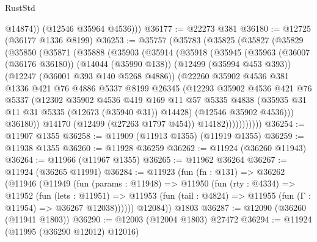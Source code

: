 \begin{lexlean}{RustStd}
\begin{coremodule}
{\begin{coremodule}
{{{{{{{{{{{{{{{{{{{{{{{{{{{{{{{{{{{{{{{{{{{{{{{{{{{{{{{{{{{{{{{{{{{{{{{{{{{{{{{{            @14874))
        (@12546 @35964 @4536)))
@36177 := @22273 @381
@36180 := @12725 (@36177 @1336 @8199)
@36253 := @35757
    (@35783
      (@35825
        (@35827
          (@35829
            (@35850
              (@35871
                (@35888
                  (@35903
                    (@35914
                      (@35918
                        (@35945
                          (@35963
                            (@36007 (@36176 @36180))
                            (@14044 (@35990 @138))
                            (@12499 (@35994 @453 @393))
                            (@12247 (@36001 @393 @140 @5268 @4886))
                            (@22260
                              @35902
                              @4536
                              @381
                              @1336
                              @421
                              @76
                              @4886
                              @5337
                              @8199
                              @26345
                              (@12293
                                @35902
                                @4536
                                @421
                                @76
                                @5337
                                (@12302
                                  @35902
                                  @4536
                                  @419
                                  @169
                                  @11
                                  @57
                                  @5335
                                  @4838
                                  (@35935 @31 @11 @31 @5335 (@12673 (@35940 @31)) @14428)
                                  (@12546 @35902 @4536)))
                              @36180))
                          @14170
                          (@12499 (@27263 @1797 @454))
                          @14182)))))))))))
@36254 := @11907 @1355
@36258 := @11909 (@11913 @1355) (@11919 @1355)
@36259 := @11938 @1355
@36260 := @11928 @36259
@36262 := @11924 (@36260 @11943)
@36264 := @11966 (@11967 @1355)
@36265 := @11962 @36264
@36267 := @11924 (@36265 @11991)
@36284 := @11923
    (fun (fn : @131) =>
    @36262
      (@11946
        (@11949
          (fun (params : @11948) =>
          @11950
            (fun (rty : @4334) =>
            @11952
              (fun (lets : @11951) =>
              @11953 (fun (tail : @4824) => @11955 (fun (Γ : @11954) => @36267 @12038))))))
        @12084))
    @1803
@36287 := @12090 (@36260 (@11941 @1803))
@36290 := @12003 (@12004 @1803) @27472
@36294 := @11924 (@11995 (@36290 @12012) @12016)
}}}}}}}}}}}}}}}}}}}}}}}}}}}}}}}}}}}}}}}}}}}}}}}}}}}}}}}}}}}}}}}}}}}}}}}}}}}}}}}}
\end{coremodule}}
\end{coremodule}
\end{lexlean}
